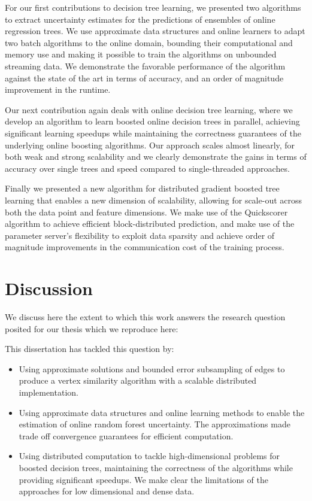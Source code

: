 For our first contributions to decision tree learning,
we presented two algorithms to extract uncertainty estimates
for the predictions of ensembles of online regression trees.
We use approximate data structures and online learners to
adapt two batch algorithms to the online domain, bounding
their computational and memory use and making it possible
to train the algorithms on unbounded streaming data. We demonstrate the
favorable performance of the algorithm against the state of
the art in terms of accuracy, and an order of magnitude improvement
in the runtime.

Our next contribution again deals with online decision tree learning, where we develop an algorithm
to learn boosted online decision trees in parallel, achieving significant
learning speedups while maintaining the correctness guarantees of the
underlying online boosting algorithms. Our approach scales almost linearly,
for both weak and strong scalability and we clearly demonstrate the gains
in terms of accuracy over single trees and speed compared to single-threaded
approaches.


Finally we presented a new algorithm for distributed gradient boosted tree
learning that enables a new dimension of scalability, allowing for scale-out
across both the data point and feature dimensions. We make use of the Quickscorer
algorithm to achieve efficient block-distributed prediction, and make use
of the parameter server's flexibility to exploit data sparsity and achieve
order of magnitude improvements in the communication cost of the training process.

\section{Discussion}

We discuss here the extent to which this work answers the research
question posited for our thesis which we reproduce here:

\begin{displayquote}
	\researchQuestion
\end{displayquote}

\noindent
This dissertation has tackled this question by:
\begin{itemize}
	\item Using approximate solutions and bounded error subsampling of edges
	to produce a vertex similarity algorithm with a scalable
	distributed implementation.

	\item Using approximate data structures and online learning methods
	to enable the estimation of online random forest uncertainty. The approximations
	made trade off convergence guarantees for efficient computation.

	\item Using distributed computation to tackle high-dimensional problems
	for boosted decision trees, maintaining the correctness of the algorithms
	while providing significant speedups. We make clear the limitations
	of the approaches for low dimensional and dense data.
\end{itemize}


